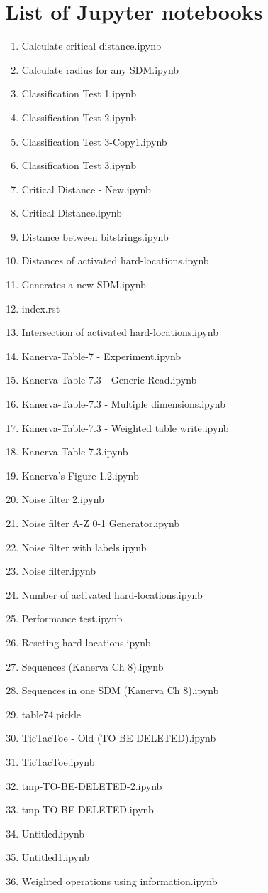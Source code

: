 %

\chapter*{List of Jupyter notebooks}


\begin{enumerate}
  \item Calculate critical distance.ipynb
  \item Calculate radius for any SDM.ipynb
  \item Classification Test 1.ipynb
  \item Classification Test 2.ipynb
  \item Classification Test 3-Copy1.ipynb
  \item Classification Test 3.ipynb
  \item Critical Distance - New.ipynb
  \item Critical Distance.ipynb
  \item Distance between bitstrings.ipynb
  \item Distances of activated hard-locations.ipynb
  \item Generates a new SDM.ipynb
  \item index.rst
  \item Intersection of activated hard-locations.ipynb
  \item Kanerva-Table-7 - Experiment.ipynb
  \item Kanerva-Table-7.3 - Generic Read.ipynb
  \item Kanerva-Table-7.3 - Multiple dimensions.ipynb
  \item Kanerva-Table-7.3 - Weighted table write.ipynb
  \item Kanerva-Table-7.3.ipynb
  \item Kanerva's Figure 1.2.ipynb
  \item Noise filter 2.ipynb
  \item Noise filter A-Z 0-1 Generator.ipynb
  \item Noise filter with labels.ipynb
  \item Noise filter.ipynb
  \item Number of activated hard-locations.ipynb
  \item Performance test.ipynb
  \item Reseting hard-locations.ipynb
  \item Sequences (Kanerva Ch 8).ipynb
  \item Sequences in one SDM (Kanerva Ch 8).ipynb
  \item table74.pickle
  \item TicTacToe - Old (TO BE DELETED).ipynb
  \item TicTacToe.ipynb
  \item tmp-TO-BE-DELETED-2.ipynb
  \item tmp-TO-BE-DELETED.ipynb
  \item Untitled.ipynb
  \item Untitled1.ipynb
  \item Weighted operations using information.ipynb
\end{enumerate}
